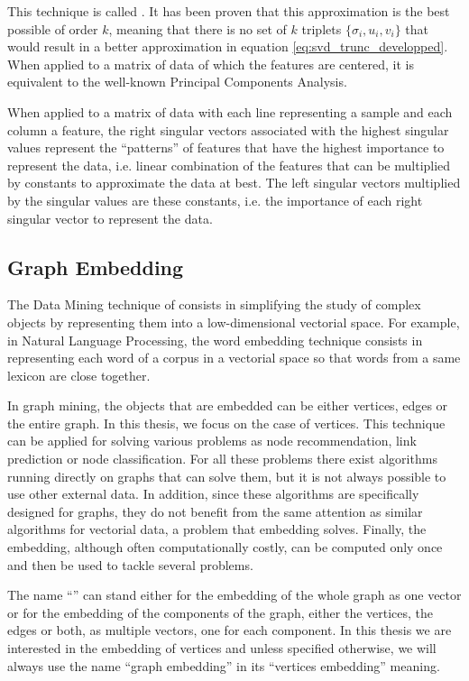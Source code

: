 This technique is called . It has been proven that this approximation is the best possible of order $k$, meaning that there is no set of $k$ triplets $\{\sigma_i, u_i, v_i\}$ that would result in a better approximation in equation \ref{eq:svd_trunc_developped}. When applied to a matrix of data of which the features are centered, it is equivalent to the well-known Principal Components Analysis.

When applied to a matrix of data with each line representing a sample and each column a feature, the right singular vectors associated with the highest singular values represent the “patterns” of features that have the highest importance to represent the data, i.e. linear combination of the features that can be multiplied by constants to approximate the data at best. The left singular vectors multiplied by the singular values are these constants, i.e. the importance of each right singular vector to represent the data.

\subsection{Graph Embedding}\label{subsec:intro_graph_embedding}
The Data Mining technique of  consists in simplifying the study of complex objects by representing them into a low-dimensional vectorial space. For example, in Natural Language Processing, the word embedding technique consists in representing each word of a corpus in a vectorial space so that words from a same lexicon are close together.

In graph mining, the objects that are embedded can be either vertices, edges or the entire graph. In this thesis, we focus on the case of vertices. This technique can be applied for solving various problems as node recommendation, link prediction or node classification. For all these problems there exist algorithms running directly on graphs that can solve them, but it is not always possible to use other external data. In addition, since these algorithms are specifically designed for graphs, they do not benefit from the same attention as similar algorithms for vectorial data, a problem that embedding solves. Finally, the embedding, although often computationally costly, can be computed only once and then be used to tackle several problems. 

The name “” can stand either for the embedding of the whole graph as one vector or for the embedding of the components of the graph, either the vertices, the edges or both, as multiple vectors, one for each component. In this thesis we are interested in the embedding of vertices and unless specified otherwise, we will always use the name “graph embedding” in its “vertices embedding” meaning.

